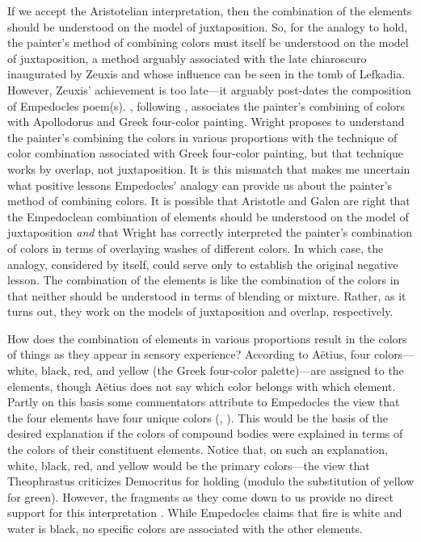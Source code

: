 If we accept the Aristotelian interpretation, then the combination of the elements should be understood on the model of juxtaposition. So, for the analogy to hold, the painter's method of combining colors must itself be understood on the model of juxtaposition, a method arguably associated with the late chiaroscuro inaugurated by Zeuxis and whose influence can be seen in the tomb of Lefkadia. However, Zeuxis' achievement is too late---it arguably post-dates the composition of Empedocles poem(s).  \citet[38--39]{Wright:1981zr}, following \citet[148]{Guthrie:1965ys}, associates the painter's combining of colors with Apollodorus and Greek four-color painting. Wright proposes to understand the painter's combining the colors in various proportions with the technique of color combination associated with Greek four-color painting, but that technique works by overlap, not juxtaposition. It is this mismatch that makes me uncertain what positive lessons Empedocles' analogy can provide us about the painter's method of combining colors. It is possible that Aristotle and Galen are right that the Empedoclean combination of elements should be understood on the model of juxtaposition \emph{and} that Wright has correctly interpreted the painter's combination of colors in terms of overlaying washes of different colors. In which case, the analogy, considered by itself, could serve only to establish the original negative lesson. The combination of the elements is like the combination of the colors in that neither should be understood in terms of blending or mixture. Rather, as it turns out, they work on the models of juxtaposition and overlap, respectively.

How does the combination of elements in various proportions result in the colors of things as they appear in sensory experience? According to Aëtius, four colors---white, black, red, and yellow (the Greek four-color palette)---are assigned to the elements, though Aëtius does not say which color belongs with which element. Partly on this basis some commentators attribute to Empedocles the view that the four elements have four unique colors (\citealt[217]{Cherniss:1935fk}, \citealt[152-3]{Siegel:1959fk}). This would be the basis of the desired explanation if the colors of compound bodies were explained in terms of the colors of their constituent elements. Notice that, on such an explanation, white, black, red, and yellow would be the primary colors---the view that Theophrastus criticizes Democritus for holding (modulo the substitution of yellow for green).  However, the fragments as they come down to us provide no direct support for this interpretation \citep[see][]{Ierodiakonou:2005fk}. While Empedocles claims that fire is white and water is black, no specific colors are associated with the other elements. 

